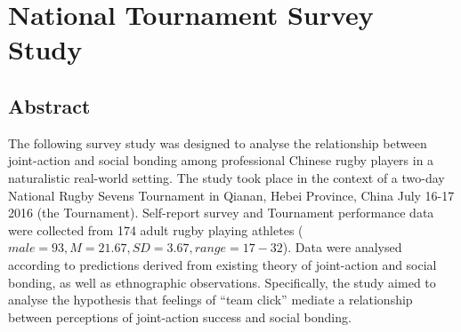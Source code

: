 %




%





\chapter{\label{tournamentSurvey}National Tournament Survey Study}


\section{Abstract}
The following survey study was designed to analyse the relationship between joint-action and social bonding among professional Chinese rugby players in a naturalistic real-world setting. The study took place in the context of a two-day National Rugby Sevens Tournament in Qianan, Hebei Province, China July 16-17 2016 (the Tournament).  Self-report survey and Tournament performance data were collected from 174 adult rugby playing athletes ($male = 93, M = 21.67, SD = 3.67, range = 17-32$). Data were analysed according to predictions derived from existing theory of joint-action and social bonding, as well as ethnographic observations. Specifically, the study aimed to analyse the hypothesis that feelings of ``team click'' mediate a relationship between perceptions of joint-action success and social bonding.

